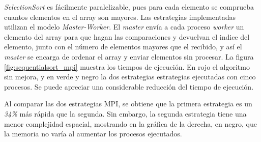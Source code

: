 		\textit{SelectionSort} es fácilmente paralelizable, pues para cada elemento se comprueba cuantos elementos en el array son mayores. Las estrategias implementadas utilizan el modelo \textit{Master-Worker}. El \textit{master} envía a cada proceso \textit{worker} un elemento del array para que hagan las comparaciones y devuelvan el indice del elemento, junto con el número de elementos mayores que el recibido, y así el \textit{master} se encarga de ordenar el array y enviar elementos sin procesar. La figura \ref{fig:sequentialsort_mpi} muestra los tiempos de ejecución. En rojo el algoritmo sin mejora, y en verde y negro la dos estrategias estrategias ejecutadas con cinco procesos. Se puede apreciar una considerable reducción del tiempo de ejecución. 
		
		Al comparar las dos estrategias MPI, se obtiene que la primera estrategia es un \textit{34\%} más rápida que la segunda. Sin embargo, la segunda estrategia tiene una menor complejidad espacial, mostrando en la gráfica de la derecha, en negro, que la memoria no varía al aumentar los procesos ejecutados.
						
